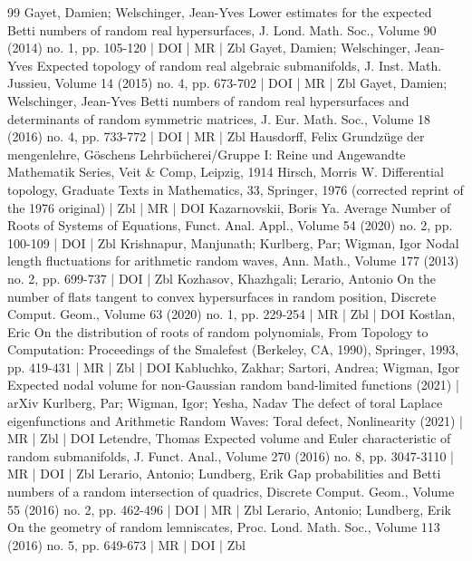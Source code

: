 \documentclass[10pt]{amsart}
\theoremstyle{definition}\newtheorem{defi}[theo]{Definition}\newtheorem{rema}[theo]{Remark}\newtheorem{exam}[theo]{Example}\newtheorem{exem}[theo]{Example}\newtheorem{nota}[theo]{Notation}
\begin{document}
\begin{thebibliography}{99}
Gayet, Damien; Welschinger, Jean-Yves Lower estimates for the expected Betti numbers of random real hypersurfaces, J. Lond. Math. Soc., Volume 90 (2014) no. 1, pp. 105-120 | DOI | MR | Zbl
Gayet, Damien; Welschinger, Jean-Yves Expected topology of random real algebraic submanifolds, J. Inst. Math. Jussieu, Volume 14 (2015) no. 4, pp. 673-702 | DOI | MR | Zbl
Gayet, Damien; Welschinger, Jean-Yves Betti numbers of random real hypersurfaces and determinants of random symmetric matrices, J. Eur. Math. Soc., Volume 18 (2016) no. 4, pp. 733-772 | DOI | MR | Zbl
Hausdorff, Felix Grundzüge der mengenlehre, Göschens Lehrbücherei/Gruppe I: Reine und Angewandte Mathematik Series, Veit \& Comp, Leipzig, 1914
Hirsch, Morris W. Differential topology, Graduate Texts in Mathematics, 33, Springer, 1976 (corrected reprint of the 1976 original) | Zbl | MR | DOI
Kazarnovskii, Boris Ya. Average Number of Roots of Systems of Equations, Funct. Anal. Appl., Volume 54 (2020) no. 2, pp. 100-109 | DOI | Zbl
Krishnapur, Manjunath; Kurlberg, Par; Wigman, Igor Nodal length fluctuations for arithmetic random waves, Ann. Math., Volume 177 (2013) no. 2, pp. 699-737 | DOI | Zbl
Kozhasov, Khazhgali; Lerario, Antonio On the number of flats tangent to convex hypersurfaces in random position, Discrete Comput. Geom., Volume 63 (2020) no. 1, pp. 229-254 | MR | Zbl | DOI
Kostlan, Eric On the distribution of roots of random polynomials, From Topology to Computation: Proceedings of the Smalefest (Berkeley, CA, 1990), Springer, 1993, pp. 419-431 | MR | Zbl | DOI
Kabluchko, Zakhar; Sartori, Andrea; Wigman, Igor Expected nodal volume for non-Gaussian random band-limited functions (2021) | arXiv
Kurlberg, Par; Wigman, Igor; Yesha, Nadav The defect of toral Laplace eigenfunctions and Arithmetic Random Waves: Toral defect, Nonlinearity (2021) | MR | Zbl | DOI
Letendre, Thomas Expected volume and Euler characteristic of random submanifolds, J. Funct. Anal., Volume 270 (2016) no. 8, pp. 3047-3110 | MR | DOI | Zbl
Lerario, Antonio; Lundberg, Erik Gap probabilities and Betti numbers of a random intersection of quadrics, Discrete Comput. Geom., Volume 55 (2016) no. 2, pp. 462-496 | DOI | MR | Zbl
Lerario, Antonio; Lundberg, Erik On the geometry of random lemniscates, Proc. Lond. Math. Soc., Volume 113 (2016) no. 5, pp. 649-673 | MR | DOI | Zbl

\end{thebibliography}
\end{document}
